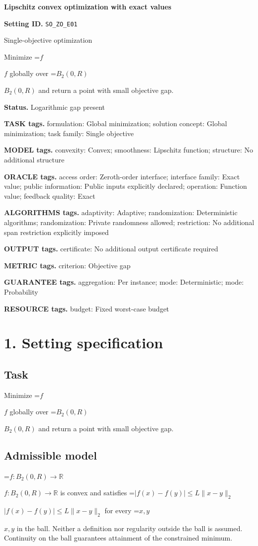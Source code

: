 \documentclass[10pt,a4paper]{article}
\newcommand{\AtlasMath}[1]{\par\begingroup\centering\setbox0=\hbox{$\displaystyle #1$}\ifdim\wd0>1.4\linewidth\typeout{ATLAS WIDE FORMULA: \the\wd0}\fi\ifdim\wd0>\linewidth\resizebox{\linewidth}{!}{\box0}\else\box0\fi\par\endgroup}
\newcommand{\AtlasInlineMath}[1]{\begingroup\setbox0=\hbox{$#1$}\ifdim\wd0>.4\linewidth\endgroup\AtlasMath{#1}\else\endgroup$#1$\fi}
\begin{document}
\raggedright

{\LARGE\bfseries\sffamily\color{AtlasNavy} Lipschitz convex optimization with exact values\par}\vspace{5pt}
\textbf{Setting ID.} \texttt{SO\_\allowbreak{}\allowbreak{}ZO\_\allowbreak{}\allowbreak{}E01}

Single-objective optimization

Minimize \AtlasInlineMath{f} globally over \AtlasInlineMath{B_2(0,R)} and return a point with small objective gap.

\textbf{Status.} Logarithmic gap present

\textbf{TASK tags.} formulation: Global minimization; solution concept: Global minimization; task family: Single objective

\textbf{MODEL tags.} convexity: Convex; smoothness: Lipschitz function; structure: No additional structure

\textbf{ORACLE tags.} access order: Zeroth-order interface; interface family: Exact value; public information: Public inputs explicitly declared; operation: Function value; feedback quality: Exact

\textbf{ALGORITHMS tags.} adaptivity: Adaptive; randomization: Deterministic algorithms; randomization: Private randomness allowed; restriction: No additional span restriction explicitly imposed

\textbf{OUTPUT tags.} certificate: No additional output certificate required

\textbf{METRIC tags.} criterion: Objective gap

\textbf{GUARANTEE tags.} aggregation: Per instance; mode: Deterministic; mode: Probability

\textbf{RESOURCE tags.} budget: Fixed worst-case budget

\section{1. Setting specification}
\subsection{Task}
Minimize \AtlasInlineMath{f} globally over \AtlasInlineMath{B_2(0,R)} and return a point with small objective gap.

\subsection{Admissible model}
\AtlasInlineMath{f:B_2(0,R)\to\mathbb{R}} is convex and satisfies \AtlasInlineMath{|f(x)-f(y)|\le L\|x-y\|_2} for every \AtlasInlineMath{x,y} in the ball. Neither a definition nor regularity outside the ball is assumed. Continuity on the ball guarantees attainment of the constrained minimum.
\end{document}
